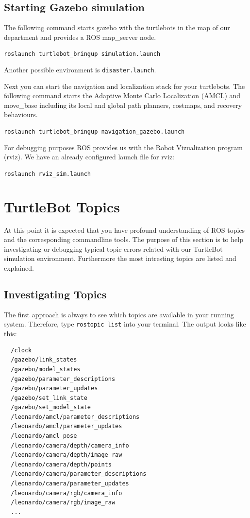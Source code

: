 \subsection{Starting Gazebo simulation}
\label{ssec:StartSimulation}

The following command starts gazebo with the turtlebots in the map of our department and provides a ROS map\_server node.

\verb$roslaunch turtlebot_bringup simulation.launch$

Another possible environment is \verb$disaster.launch$.

Next you can start the navigation and localization stack for your turtlebots. The following command starts the Adaptive Monte Carlo Localization (AMCL) and move\_base including its local and global path planners, costmaps, and recovery behaviours.

\verb$roslaunch turtlebot_bringup navigation_gazebo.launch$

For debugging purposes ROS provides us with the Robot Vizualization program (rviz). We have an already configured launch file for rviz:

\verb$roslaunch rviz_sim.launch$

\section{TurtleBot Topics}
\label{sec:TurtleBotTopics}

At this point it is expected that you have profound understanding of ROS topics and the corresponding commandline tools. The purpose of this section is to help investigating or debugging typical topic errors related with our TurtleBot simulation environment. Furthermore the most intresting topics are listed and explained.

\subsection{Investigating Topics}
\label{ssec:Investigating Topics}

The first approach is always to see which topics are available in your running system. Therefore, type \verb$rostopic list$ into your terminal. The output looks like this:

\begin{verbatim}
  /clock
  /gazebo/link_states
  /gazebo/model_states
  /gazebo/parameter_descriptions
  /gazebo/parameter_updates
  /gazebo/set_link_state
  /gazebo/set_model_state
  /leonardo/amcl/parameter_descriptions
  /leonardo/amcl/parameter_updates
  /leonardo/amcl_pose
  /leonardo/camera/depth/camera_info
  /leonardo/camera/depth/image_raw
  /leonardo/camera/depth/points
  /leonardo/camera/parameter_descriptions
  /leonardo/camera/parameter_updates
  /leonardo/camera/rgb/camera_info
  /leonardo/camera/rgb/image_raw
  ...
\end{verbatim}

